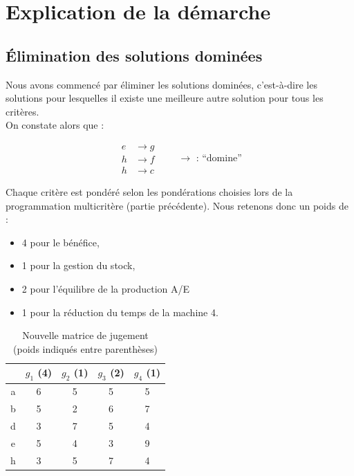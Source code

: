 \documentclass[paper=a4, fontsize=11pt]{report}
\numberwithin{equation}{section}		%
\numberwithin{figure}{section}			%
\numberwithin{table}{section}				%
\begin{document}
\section{Explication de la démarche}

\subsection{Élimination des solutions dominées}

Nous avons commencé par éliminer les solutions dominées, c’est-à-dire les solutions pour lesquelles il existe une meilleure autre solution pour tous les critères.\\

On constate alors que :

\begin{equation*}
  \left.
    \begin{aligned}
	e & \rightarrow g \\
 h & \rightarrow f \\
 h & \rightarrow c 
    \end{aligned}
  \right. \quad \quad \rightarrow \text{ : “domine”}
\end{equation*}

Chaque critère est pondéré selon les pondérations choisies lors de la programmation multicritère (partie précédente). 
Nous retenons donc un poids de :\\

\begin{itemize}
\item 4 pour le bénéfice,
\item 1 pour la gestion du stock,
\item 2 pour l’équilibre de la production A/E
\item 1 pour la réduction du temps de la machine 4.\\
\end{itemize}


\begin{table}[H]
\begin{center}
\begin{tabular}{c|cccc}
 & $g_1$ (4) & $g_2$ (1) & $g_3$ (2) & $g_4$ (1) \\ 
\hline 
a & 6 & 5 & 5 & 5 \\ 
b & 5 & 2 & 6 & 7 \\ 
d & 3 & 7 & 5 & 4 \\ 
e & 5 & 4 & 3 & 9 \\ 
h & 3 & 5 & 7 & 4 \\ 
\end{tabular} 
\caption{Nouvelle matrice de jugement\\ 
(poids indiqués entre parenthèses)} 
\end{center}
\end{table}
\end{document}
